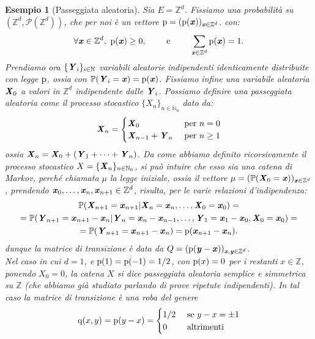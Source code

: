 \documentclass[11pt]{book}
\theoremstyle{Definizione}
\theoremstyle{TeoremaProposizioneLemmaCorollario}
\theoremstyle{OsservazioneNota}
\newtheorem{myes}{Esempio}[section]
\newcommand{\N}{\mathbb{N}}
\newcommand{\Z}{\mathbb{Z}}
\newcommand{\gri}[1]{\textbf{\textit{{#1}}}}
\renewcommand{\P}{\mathbb{P}}
\newcommand{\p}{\textup{p}}
\newcommand{\q}{\textup{q}}
\begin{document}
\begin{myes}[Passeggiata aleatoria]
Sia $E = \Z^d$. Fissiamo una probabilità su $(\Z^d,\mathcal{P}(\Z^d))$, che per noi è un vettore $\p = (\p(\gri{x}))_{\gri{x}\in \Z^d}$. con:
$$
\forall \gri{x}\in \Z^d,\ \p(\gri{x}) \geq 0,\qquad \textup{ e }\qquad \sum_{\gri{x}\in \Z^d} \p(\gri{x}) = 1.
$$
Prendiamo ora $\{\gri{Y}_i\}_{i\in \N}$ variabili aleatorie indipendenti identicamente distribuite con legge $\p$, ossia con $\P(\gri{Y}_i = \gri{x}) = \p(\gri{x})$. Fissiamo infine una variabile aleatoria $\gri{X}_0$ a valori in $\Z^d$ indipendente dalle $\gri{Y}_i$. Possiamo definire una passeggiata aleatoria come il processo stocastico $\{X_n\}_{n\in \N_0}$ dato da:
$$
\gri{X}_n = \begin{cases}
\gri{X}_0 &\textup{ per }n = 0\\
\gri{X}_{n-1}+\gri{Y}_n &\textup{ per }n \geq 1
\end{cases}
$$
ossia $\gri{X}_n = \gri{X}_0 + (\gri{Y}_1+\cdots+\gri{Y}_n)$. Da come abbiamo definito ricorsivamente il processo stocastico $X = \{\gri{X}_n\}_{n\in \N_0}$, si può intuire che esso sia una catena di Markov, perché chiamata $\mu$ la legge iniziale, ossia il vettore $\mu = (\P(\gri{X}_0 = \gri{x}))_{\gri{x}\in \Z^d}$, prendendo $\gri{x}_0,\dots,\gri{x}_n,\gri{x}_{n+1}\in \Z^d$, risulta, per le varie relazioni d'indipendenza:
\begin{multline*}
\P(\gri{X}_{n+1} = \gri{x}_{n+1}| \gri{X}_n = \gri{x}_n,\dots,\gri{X}_0 = \gri{x}_0)= \\ 
= \P(\gri{Y}_{n+1} = \gri{x}_{n+1}-\gri{x}_n| \gri{Y}_{n} = \gri{x}_n-\gri{x}_{n-1},\dots,\gri{Y}_1 = \gri{x}_1-\gri{x}_0,\gri{X}_0 = \gri{x}_0)= \\
= \P(\gri{Y}_{n+1} = \gri{x}_{n+1}-\gri{x}_n) = \p(\gri{x}_{n+1}-\gri{x}_n).
\end{multline*}
dunque la matrice di transizione è data da $Q = (\p(\gri{y}-\gri{x}))_{\gri{x},\gri{y}\in \Z^d}$.\\
Nel caso in cui $d = 1$, e $\p(1) = \p(-1) = 1/2$, con $\p(x) = 0$ per i restanti $x\in \Z$, ponendo $X_0 = 0$, la catena $X$ si dice passeggiata aleatoria semplice e simmetrica su $\Z$ (che abbiamo già studiato parlando di prove ripetute indipendenti). In tal caso la matrice di transizione è una roba del genere
$$
\q(x,y) = \p(y-x) = \begin{cases}
1/2 &\textup{ se }y-x = \pm 1\\
0 &\textup{ altrimenti}
\end{cases}
$$
\end{myes}
\end{document}
